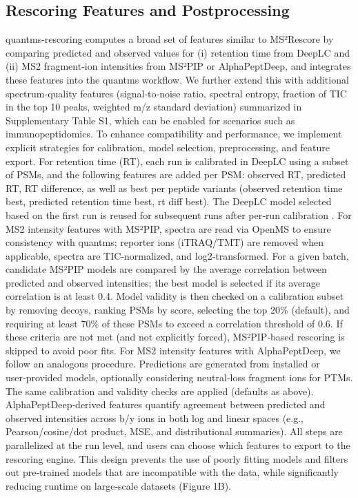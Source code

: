 \documentclass[12pt]{article}
\begin{document}
\subsection{Rescoring Features and Postprocessing}
quantms-rescoring computes a broad set of features similar to MS²Rescore by comparing predicted and observed values for (i) retention time from DeepLC and (ii) MS2 fragment‑ion intensities from MS²PIP or AlphaPeptDeep, and integrates these features into the quantms workflow. We further extend this with additional spectrum‑quality features (signal‑to‑noise ratio, spectral entropy, fraction of TIC in the top 10 peaks, weighted m/z standard deviation) summarized in Supplementary Table S1, which can be enabled for scenarios such as immunopeptidomics.
To enhance compatibility and performance, we implement explicit strategies for calibration, model selection, preprocessing, and feature export. For retention time (RT), each run is calibrated in DeepLC using a subset of PSMs, and the following features are added per PSM: observed RT, predicted RT, RT difference, as well as best per peptide variants (observed retention time best, predicted retention time best, rt diff best). The DeepLC model selected based on the first run is reused for subsequent runs after per‑run calibration \cite{bouwmeester_deeplc_2025}.
For MS2 intensity features with MS²PIP, spectra are read via OpenMS to ensure consistency with quantms; reporter ions (iTRAQ/TMT) are removed when applicable, spectra are TIC‑normalized, and log2‑transformed. For a given batch, candidate MS²PIP models are compared by the average correlation between predicted and observed intensities; the best model is selected if its average correlation is at least 0.4. Model validity is then checked on a calibration subset by removing decoys, ranking PSMs by score, selecting the top 20\% (default), and requiring at least 70\% of these PSMs to exceed a correlation threshold of 0.6. If these criteria are not met (and not explicitly forced), MS²PIP‑based rescoring is skipped to avoid poor fits.
For MS2 intensity features with AlphaPeptDeep, we follow an analogous procedure. Predictions are generated from installed or user‑provided models, optionally considering neutral‑loss fragment ions for PTMs. The same calibration and validity checks are applied (defaults as above). AlphaPeptDeep‑derived features quantify agreement between predicted and observed intensities across b/y ions in both log and linear spaces (e.g., Pearson/cosine/dot product, MSE, and distributional summaries).
All steps are parallelized at the run level, and users can choose which features to export to the rescoring engine. This design prevents the use of poorly fitting models and filters out pre‑trained models that are incompatible with the data, while significantly reducing runtime on large‑scale datasets (Figure 1B).
\end{document}
